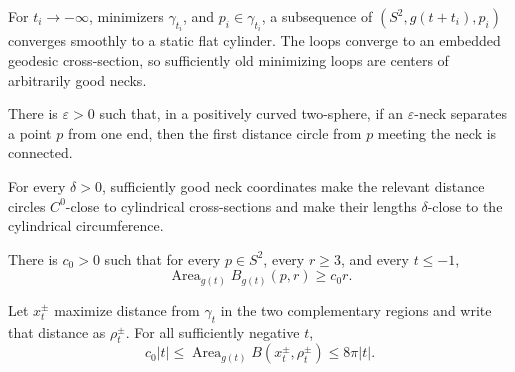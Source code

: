 \begin{lemma}
\label{lem:chow-iv-asymptotic-cylinder-minimizing-loop}
For \(t_i\to-\infty\), minimizers \(\gamma_{t_i}\), and
\(p_i\in\gamma_{t_i}\), a subsequence of
\((S^2,g(t+t_i),p_i)\) converges smoothly to a static flat cylinder.  The
loops converge to an embedded geodesic cross-section, so sufficiently old
minimizing loops are centers of arbitrarily good necks.
\end{lemma}

\begin{lemma}
\label{lem:chow-iv-connected-distance-circles}
There is \(\varepsilon>0\) such that, in a positively curved two-sphere, if
an \(\varepsilon\)-neck separates a point \(p\) from one end, then the first
distance circle from \(p\) meeting the neck is connected.
\end{lemma}

\begin{lemma}
\label{lem:chow-iv-distance-circles-near-neck-center}
For every \(\delta>0\), sufficiently good neck coordinates make the relevant
distance circles \(C^0\)-close to cylindrical cross-sections and make their
lengths \(\delta\)-close to the cylindrical circumference.
\end{lemma}

\begin{lemma}
\label{lem:chow-iv-area-lower-bound-balls}
There is \(c_0>0\) such that for every \(p\in S^2\), every \(r\ge3\), and
every \(t\le-1\),
\[
 \operatorname{Area}_{g(t)}B_{g(t)}(p,r)\ge c_0r.
\]
\end{lemma}

\begin{lemma}
\label{lem:chow-iv-polar-ball-area-time}
Let \(x_t^\pm\) maximize distance from \(\gamma_t\) in the two complementary
regions and write that distance as \(\rho_t^\pm\).  For all sufficiently
negative \(t\),
\[
 c_0|t|\le\operatorname{Area}_{g(t)}B(x_t^\pm,\rho_t^\pm)
 \le8\pi|t|.
\]
\end{lemma}

